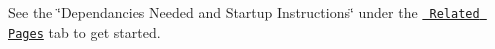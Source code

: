 See the \char`\"{}\+Dependancies Needed and Startup Instructions\char`\"{} under the \href{pages.html}{\texttt{ Related Pages}} tab to get started. 
